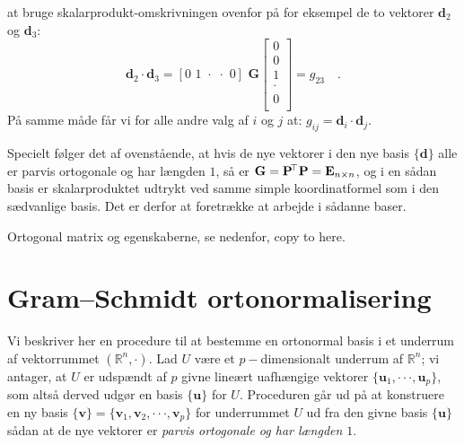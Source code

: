 at bruge skalarprodukt-omskrivningen ovenfor på for eksempel de to vektorer $\mathbf{d}_{2}$ og $\mathbf{d}_{3}$:
\begin{equation}
\mathbf{d}_{2}\cdot \mathbf{d}_{3} =  [0 \, \, 1 \, \, \cdot \,\, \cdot \, \, 0]\,\, \mathbf{G} \left[
                                           \begin{array}{c}
                                            0 \\
                                             0 \\
                                             1  \\
                                             \cdot \\
                                             0 \\
                                           \end{array}
                                         \right] = g_{23} \quad .
\end{equation}
På samme måde får vi for alle andre valg af $i$ og $j$ at: $g_{ij} = \mathbf{d}_{i}\cdot \mathbf{d}_{j}$.

\begin{aha} \label{ahaOrtoBeregn}
Specielt følger det af ovenstående, at hvis de nye vektorer i den nye basis $\{ \mathbf{d} \}$ alle er parvis ortogonale og har længden $1$, så er $\mathbf{G} = \mathbf{P}\hspace*{-.6mm}^{\top} \mathbf{P} = \mathbf{E}_{n \times n}$, og i en sådan basis er skalarproduktet udtrykt ved samme simple koordinatformel som i den sædvanlige basis. Det er derfor at foretrække at arbejde i sådanne baser.
\end{aha}


\begin{definition}
Ortogonal matrix og egenskaberne, se nedenfor, copy to here.
\end{definition}




\section{Gram--Schmidt ortonormalisering}
Vi beskriver her en procedure til at bestemme en ortonormal basis i et underrum af vektorrummet $(\mathbb{R}^{n}, \cdot)$. Lad $U$ være et $p-$dimensionalt underrum af $\mathbb{R}^{n}$; vi antager, at $U$ er udspændt af $p$ givne lineært uafhængige vektorer $\{ \mathbf{u}_{1}, \cdot  \cdot \cdot, \mathbf{u}_{p} \}$, som altså derved udgør en basis $\{ \mathbf{u} \}$ for $U$. Proceduren går ud på at konstruere en ny basis $\{ \mathbf{v} \} = \{ \mathbf{v}_{1}, \mathbf{v}_{2}, \cdot \cdot \cdot ,  \mathbf{v}_{p} \}$ for underrummet $U$ ud fra den givne basis $\{ \mathbf{u} \}$ sådan at de nye vektorer er {\em{parvis ortogonale og har længden $1$}}.

